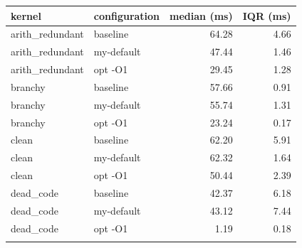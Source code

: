 \begin{tabular}{llrr}
\toprule
kernel & configuration & median (ms) & IQR (ms) \\
\midrule
arith\_redundant & baseline & 64.28 & 4.66 \\
arith\_redundant & my-default & 47.44 & 1.46 \\
arith\_redundant & opt -O1 & 29.45 & 1.28 \\
\addlinespace
branchy & baseline & 57.66 & 0.91 \\
branchy & my-default & 55.74 & 1.31 \\
branchy & opt -O1 & 23.24 & 0.17 \\
\addlinespace
clean & baseline & 62.20 & 5.91 \\
clean & my-default & 62.32 & 1.64 \\
clean & opt -O1 & 50.44 & 2.39 \\
\addlinespace
dead\_code & baseline & 42.37 & 6.18 \\
dead\_code & my-default & 43.12 & 7.44 \\
dead\_code & opt -O1 & 1.19 & 0.18 \\
\addlinespace
\bottomrule
\end{tabular}
